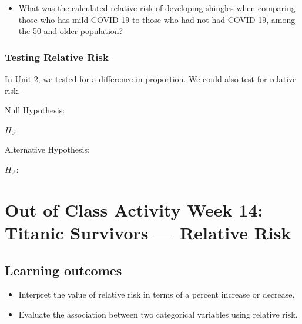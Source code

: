 \documentclass[
]{report}
\providecommand{\tightlist}{%
  \setlength{\itemsep}{0pt}\setlength{\parskip}{0pt}}
\begin{document}
\begin{itemize}
\tightlist
\item
  What was the calculated relative risk of developing shingles when comparing those who has mild COVID-19 to those who had not had COVID-19, among the 50 and older population?
\end{itemize}

\vspace{0.8in}

\hypertarget{testing-relative-risk}{%
\subsubsection*{Testing Relative Risk}\label{testing-relative-risk}}

In Unit 2, we tested for a difference in proportion. We could also test for relative risk.


Null Hypothesis:

\(H_0:\)

\vspace{0.2in}

Alternative Hypothesis:

\(H_A:\)

\vspace{0.2in}


\newpage

\hypertarget{out-of-class-activity-week-14-titanic-survivors-relative-risk}{%
\section{Out of Class Activity Week 14: Titanic Survivors --- Relative Risk}\label{out-of-class-activity-week-14-titanic-survivors-relative-risk}}


\hypertarget{learning-outcomes-11}{%
\subsection{Learning outcomes}\label{learning-outcomes-11}}

\begin{itemize}
\item
  Interpret the value of relative risk in terms of a percent increase or decrease.
\item
  Evaluate the association between two categorical variables using relative risk.
\end{itemize}
\end{document}
